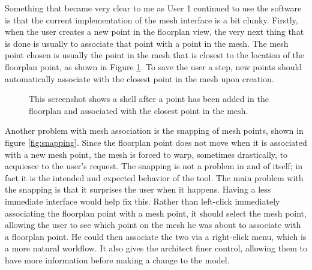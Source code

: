 \documentclass{thesis}
\begin{document}
Something that became very clear to me as User 1 continued to use the software is that the current implementation of the mesh
interface is a bit clunky.  Firstly, when the user creates a new point in the floorplan view, the very next thing that is done is
usually to associate that point with a point in the mesh.  The mesh point chosen is usually the point in the mesh that is closest
to the location of the floorplan point, as shown in Figure \ref{fig:closest_point}.  To save the user a step, new points
should automatically associate with the closest point in the mesh upon creation.

\begin{figure}
\caption[Association with the closest point]{This screenshot shows a shell after a point has been added in the floorplan and
associated with the closest point in the mesh.}
\label{fig:closest_point}
\end{figure}

Another problem with mesh association is the snapping of mesh points, shown in figure \ref{fig:snapping}.  Since the floorplan
point does not move when it is associated with a new mesh point, the mesh is forced to warp, sometimes drastically, to acquiesce
to the user's request.  The snapping is not a problem in and of itself; in fact it is the intended and expected behavior of the
tool.  The main problem with the snapping is that it surprises the user when it happens.  Having a less immediate interface would
help fix this.  Rather than left-click immediately associating the floorplan point with a mesh point, it should select the mesh
point, allowing the user to see which point on the mesh he was about to associate with a floorplan point.  He could then
associate the two via a right-click menu, which is a more natural workflow.  It also gives the architect finer control, allowing
them to have more information before making a change to the model.
\end{document}
